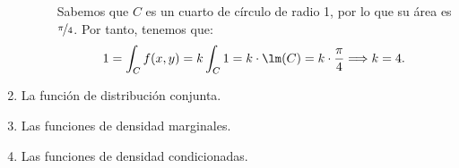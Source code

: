 \begin{ejercicio}
\begin{enumerate}
\begin{description}
            Sabemos que $C$ es un cuarto de círculo de radio 1, por lo que su área es $\nicefrac{\pi}{4}$. Por tanto, tenemos que:
            \begin{equation*}
                1=\int_C f(x, y) = k\int_C 1 = k\cdot \lm(C) = k\cdot \dfrac{\pi}{4} \Longrightarrow k=4.
            \end{equation*}
        \end{description}
        \item La función de distribución conjunta.
        \item Las funciones de densidad marginales.
        \item Las funciones de densidad condicionadas.
    \end{enumerate}
\end{ejercicio}